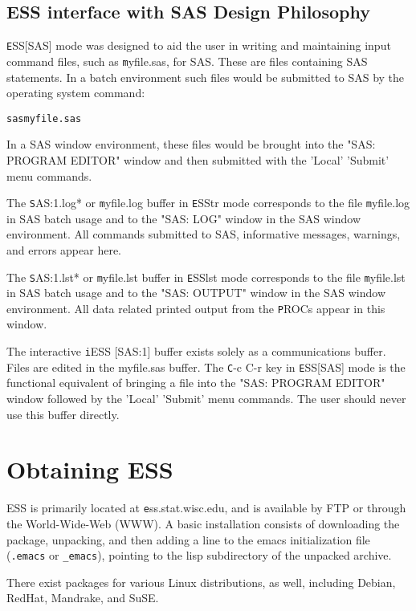 \documentclass{article}
\newenvironment{Salltt}{\small\begin{alltt}}{\end{alltt}}
\begin{document}
\subsection{ESS interface with SAS Design Philosophy}
\label{sec:SAS:phil}

{\texttt ESS[SAS]} mode was designed to aid the user in writing and maintaining
input command files, such as {\texttt myfile.sas}, for SAS.  These are files
containing SAS statements.  In a batch environment such files would be
submitted to SAS by the operating system command:
\begin{Salltt}
  sas myfile.sas
\end{Salltt}
In a SAS window environment, these files would be brought into the
"SAS: PROGRAM EDITOR" window and then submitted with the 'Local' 'Submit'
menu commands.

The {\texttt *SAS:1.log*} or {\texttt myfile.log} buffer in {\texttt ESStr} mode
corresponds to the file {\texttt myfile.log} in SAS batch usage and to the
"SAS: LOG" window in the SAS window environment.  All commands
submitted to SAS, informative messages, warnings, and errors appear
here.

The {\texttt *SAS:1.lst*} or {\texttt myfile.lst} buffer in {\texttt ESSlst} mode
corresponds to the file {\texttt myfile.lst} in SAS batch usage and to the
"SAS: OUTPUT" window in the SAS window environment.  All data related
printed output from the {\texttt PROC}s appear in this window.

The interactive {\texttt iESS [SAS:1]} buffer exists solely as a communications buffer.
Files are edited in the myfile.sas buffer.  The {\texttt C-c C-r} key in
{\texttt ESS[SAS]} mode is the functional equivalent of bringing a file into the
"SAS: PROGRAM EDITOR" window followed by the 'Local' 'Submit' menu
commands.  The user should never use this buffer directly.

\section{Obtaining ESS}
\label{sec:getIt}

ESS is primarily located at {\texttt ess.stat.wisc.edu}, and is available by FTP
or through the World-Wide-Web (WWW).  A basic installation consists of
downloading the package, unpacking, and then adding a line to the
emacs initialization file (\verb+.emacs+ or \verb+_emacs+), pointing
to the lisp subdirectory of the unpacked archive.

There exist packages for various Linux distributions, as well,
including Debian, RedHat, Mandrake, and SuSE.
\end{document}
